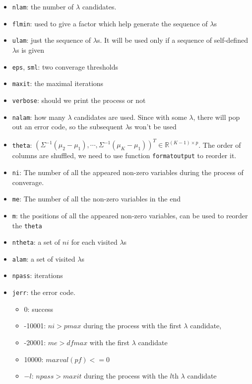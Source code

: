 \documentclass[12pt]{article}
\begin{document}
\begin{enumerate}[label={(\arabic*)}]
\begin{itemize}
		\item \verb|nlam|: the number of $\lambda$ candidates.
		\item \verb|flmin|: used to give a factor which help generate the sequence of $\lambda$s
		\item \verb|ulam|: just the sequence of $\lambda$s. It will be used only if a sequence of self-defined $\lambda$s is given
		\item \verb|eps|, \verb|sml|: two converage thresholds
		\item \verb|maxit|: the maximal iterations
		\item \verb|verbose|: should we print the process or not
		\item \verb|nalam|: how many $\lambda$ candidates are used. Since with some $\lambda$, there will pop out an error code, so the subsequent $\lambda$s won't be used
		\item \verb|theta|: $(\Sigma^{-1}(\mu_2-\mu_1), \cdots, \Sigma^{-1}(\mu_K-\mu_1))^T \in \mathbb{R}^{(K-1)\times p}$. The order of columns are shuffled, we need to use function \verb|formatoutput| to reorder it.
		\item \verb|ni|: The number of all the appeared non-zero variables during the process of converage.
		\item \verb|me|: The number of all the non-zero variables in the end
		\item \verb|m|: the positions of all the appeared non-zero variables, can be used to reorder the \verb|theta|
		\item \verb|ntheta|: a set of $ni$ for each visited $\lambda$s
		\item \verb|alam|: a set of visited $\lambda$s
		\item \verb|npass|: iterations
		\item \verb|jerr|: the error code. 
			\begin{itemize}
				\item 0: success
				\item -10001: $ni>pmax$ during the process with the first $\lambda$ candidate,
				\item -20001: $me > dfmax$ with the first $\lambda$ candidate
				\item 10000: $maxval(pf) <= 0$
				\item $-l$: $npass > maxit$ during the process with the $l$th $\lambda$ candidate
			\end{itemize}

	\end{itemize}


\end{enumerate}
\end{document}
